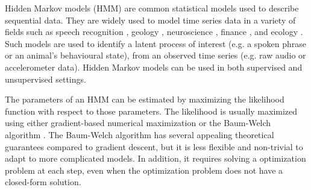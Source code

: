 

Hidden Markov models (HMM) are common statistical models used to describe sequential data. They are widely used to model time series data in a variety of fields such as speech recognition \citep{Gales:2008}, geology \citep{Bebbington:2007}, neuroscience \citep{Kottaram:2019}, finance \citep{Mamon:2007}, and ecology \citep{McClintock:2020}. Such models are used to identify a latent process of interest (e.g. a spoken phrase or an animal's behavioural state), from an observed time series (e.g. raw audio or accelerometer data). Hidden Markov models can be used in both supervised and unsupervised settings.

The parameters of an HMM can be estimated by maximizing the likelihood function with respect to those parameters. The likelihood is usually maximized using either gradient-based numerical maximization or the Baum-Welch algorithm \citep{Baum:1970}.
The Baum-Welch algorithm has several appealing theoretical guarantees compared to gradient descent, but it is less flexible and non-trivial to adapt to more complicated models. In addition, it requires solving a optimization problem at each step, even when the optimization problem does not have a closed-form solution. %

